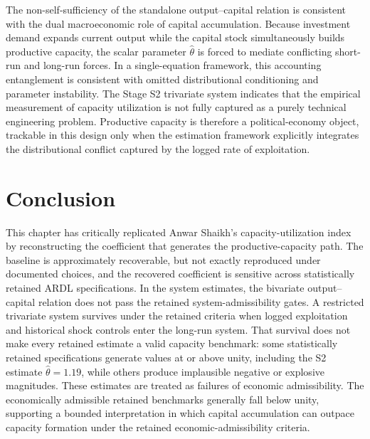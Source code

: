 \documentclass[11pt]{article}
\begin{document}
The non-self-sufficiency of the standalone output--capital relation is consistent with the dual macroeconomic role of capital accumulation. Because investment demand expands current output while the capital stock simultaneously builds productive capacity, the scalar parameter $\hat{\theta}$ is forced to mediate conflicting short-run and long-run forces. In a single-equation framework, this accounting entanglement is consistent with omitted distributional conditioning and parameter instability. The Stage S2 trivariate system indicates that the empirical measurement of capacity utilization is not fully captured as a purely technical engineering problem. Productive capacity is therefore a political-economy object, trackable in this design only when the estimation framework explicitly integrates the distributional conflict captured by the logged rate of exploitation.

\section{Conclusion}
\label{sec:conclusion}

This chapter has critically replicated Anwar Shaikh's capacity-utilization index by reconstructing the coefficient that generates the productive-capacity path. The baseline is approximately recoverable, but not exactly reproduced under documented choices, and the recovered coefficient is sensitive across statistically retained ARDL specifications. In the system estimates, the bivariate output--capital relation does not pass the retained system-admissibility gates. A restricted trivariate system survives under the retained criteria when logged exploitation and historical shock controls enter the long-run system. That survival does not make every retained estimate a valid capacity benchmark: some statistically retained specifications generate values at or above unity, including the S2 estimate $\hat{\theta}=1.19$, while others produce implausible negative or explosive magnitudes. These estimates are treated as failures of economic admissibility. The economically admissible retained benchmarks generally fall below unity, supporting a bounded interpretation in which capital accumulation can outpace capacity formation under the retained economic-admissibility criteria.
\end{document}

